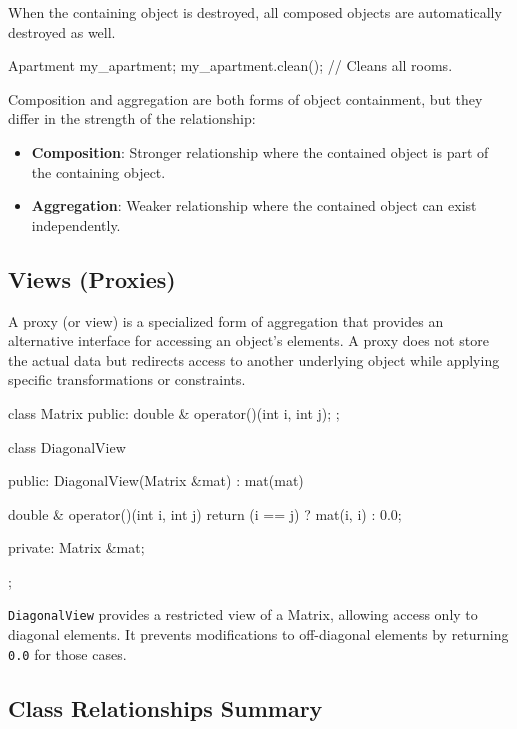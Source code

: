 \vspace{-0.5em}

When the containing object is destroyed, all composed objects are automatically destroyed as well.

\begin{codeblock}[language = C++, numbers=none]
Apartment my_apartment;
my_apartment.clean(); // Cleans all rooms.    
\end{codeblock}

\begin{observationblock}
    Composition and aggregation are both forms of object containment, but they differ in the strength of the relationship:
    \begin{itemize}
        \item \textbf{Composition}: Stronger relationship where the contained object is part of the containing object.
        \item \textbf{Aggregation}: Weaker relationship where the contained object can exist independently.
    \end{itemize}
\end{observationblock}

\subsection{Views (Proxies)}

A proxy (or view) is a specialized form of aggregation that provides an alternative interface for accessing an object's elements. A proxy does not store the actual data but redirects access to another underlying object while applying specific transformations or constraints.

\begin{codeblock}[language=C++]
class Matrix {
public:
    double & operator()(int i, int j);
};

class DiagonalView {
public:
    DiagonalView(Matrix &mat) : mat(mat) {}

    double & operator()(int i, int j) {
        return (i == j) ? mat(i, i) : 0.0; 
    }

private:
    Matrix &mat;
};
\end{codeblock}

\texttt{DiagonalView} provides a restricted view of a Matrix, allowing access only to diagonal elements. It prevents modifications to off-diagonal elements by returning \texttt{0.0} for those cases.

\subsection{Class Relationships Summary}

